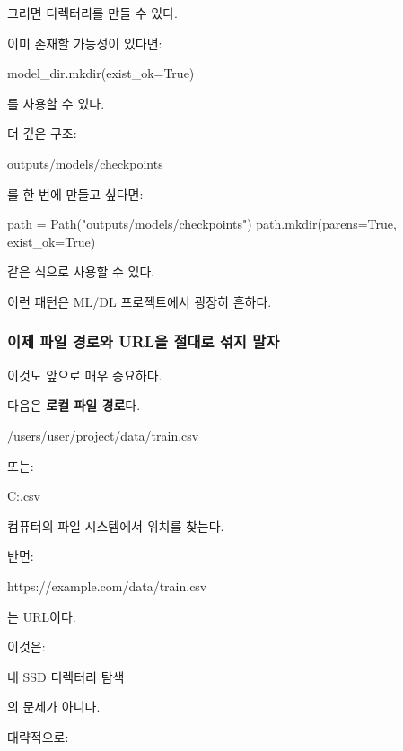 그러면 디렉터리를 만들 수 있다.

이미 존재할 가능성이 있다면:

\begin{dhkcode}
model_dir.mkdir(exist_ok=True)
\end{dhkcode}

를 사용할 수 있다.

더 깊은 구조:

\begin{dhkzsh}
outputs/models/checkpoints
\end{dhkzsh}

를 한 번에 만들고 싶다면:

\begin{dhkcode}
path = Path("outputs/models/checkpoints")
path.mkdir(parens=True, exist_ok=True)
\end{dhkcode}

같은 식으로 사용할 수 있다.

이런 패턴은 ML/DL 프로젝트에서 굉장히 흔하다.

\subsubsection{이제 파일 경로와 URL을 절대로 섞지 말자}

이것도 앞으로 매우 중요하다.

다음은 \textbf{로컬 파일 경로}다.

\begin{dhkzsh}
/users/user/project/data/train.csv
\end{dhkzsh}

또는:

\begin{dhkzsh}
C:\Users\user\project\data\train.csv
\end{dhkzsh}

컴퓨터의 파일 시스템에서 위치를 찾는다.

반면:

\begin{dhkzsh}
https://example.com/data/train.csv
\end{dhkzsh}

는 URL이다.

이것은:

\begin{dhksmry}[centered]
내 SSD
\da
디렉터리 탐색
\end{dhksmry}

의 문제가 아니다.

대략적으로:

